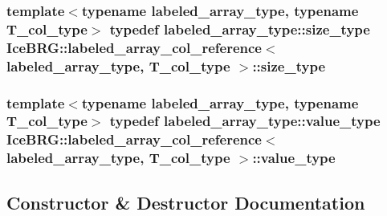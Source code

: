 \subsubsection[{size\+\_\+type}]{\setlength{\rightskip}{0pt plus 5cm}template$<$typename labeled\+\_\+array\+\_\+type, typename T\+\_\+col\+\_\+type$>$ typedef labeled\+\_\+array\+\_\+type\+::size\+\_\+type {\bf Ice\+B\+R\+G\+::labeled\+\_\+array\+\_\+col\+\_\+reference}$<$ labeled\+\_\+array\+\_\+type, T\+\_\+col\+\_\+type $>$\+::{\bf size\+\_\+type}}\label{classIceBRG_1_1labeled__array__col__reference_a5b8295af3ddffec129715ff6b7744b7e}
\hypertarget{classIceBRG_1_1labeled__array__col__reference_ab9d93b07ec3e0fbfb0604ac8b135d04d}{}
\subsubsection[{value\+\_\+type}]{\setlength{\rightskip}{0pt plus 5cm}template$<$typename labeled\+\_\+array\+\_\+type, typename T\+\_\+col\+\_\+type$>$ typedef labeled\+\_\+array\+\_\+type\+::value\+\_\+type {\bf Ice\+B\+R\+G\+::labeled\+\_\+array\+\_\+col\+\_\+reference}$<$ labeled\+\_\+array\+\_\+type, T\+\_\+col\+\_\+type $>$\+::{\bf value\+\_\+type}}\label{classIceBRG_1_1labeled__array__col__reference_ab9d93b07ec3e0fbfb0604ac8b135d04d}


\subsection{Constructor \& Destructor Documentation}
\hypertarget{classIceBRG_1_1labeled__array__col__reference_a487a048a6a6d1f26a128a58845675aa9}{}

